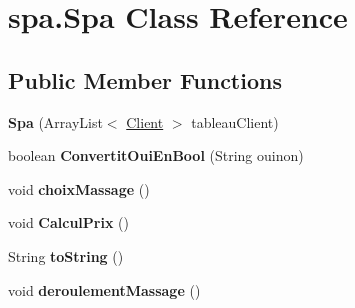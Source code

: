 \hypertarget{classspa_1_1_spa}{}\section{spa.\+Spa Class Reference}
\label{classspa_1_1_spa}
\subsection*{Public Member Functions}
\begin{DoxyCompactItemize}
\item 
{\bfseries Spa} (Array\+List$<$ \hyperlink{classclient_1_1_client}{Client} $>$ tableau\+Client)\hypertarget{classspa_1_1_spa_a62a39f9b07c2e0c835d259f6d930e880}{}\label{classspa_1_1_spa_a62a39f9b07c2e0c835d259f6d930e880}

\item 
boolean {\bfseries Convertit\+Oui\+En\+Bool} (String ouinon)\hypertarget{classspa_1_1_spa_a14f824a74e7914bfeb14f6074789798a}{}\label{classspa_1_1_spa_a14f824a74e7914bfeb14f6074789798a}

\item 
void {\bfseries choix\+Massage} ()\hypertarget{classspa_1_1_spa_a1da6de3ac40d4f1695b2d18da01679ec}{}\label{classspa_1_1_spa_a1da6de3ac40d4f1695b2d18da01679ec}

\item 
void {\bfseries Calcul\+Prix} ()\hypertarget{classspa_1_1_spa_a041299959e6ee9a7e6d53c8db7f45c23}{}\label{classspa_1_1_spa_a041299959e6ee9a7e6d53c8db7f45c23}

\item 
String {\bfseries to\+String} ()\hypertarget{classspa_1_1_spa_a961244cc5d4eef40cb21424eff00985e}{}\label{classspa_1_1_spa_a961244cc5d4eef40cb21424eff00985e}

\item 
void {\bfseries deroulement\+Massage} ()\hypertarget{classspa_1_1_spa_a8ac402175133c10d4881e43744878966}{}\label{classspa_1_1_spa_a8ac402175133c10d4881e43744878966}

\end{DoxyCompactItemize}
